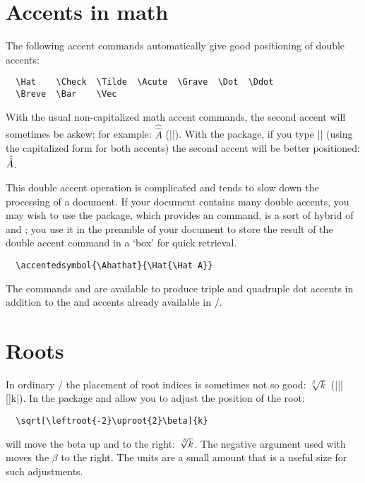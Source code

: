 \documentclass[leqno,titlepage,openany]{amsldoc}
\begin{document}
\section{Accents in math}

The following accent commands automatically give
good positioning of double accents:
\begin{verbatim}
  \Hat    \Check  \Tilde  \Acute  \Grave  \Dot  \Ddot
  \Breve  \Bar    \Vec
\end{verbatim}
With the usual non-capitalized math accent commands,
the second accent will sometimes be askew; for example:
$\hat{\hat{A}}$ (|{}|). With the  package, if
you type |{}| (using the capitalized form for both
accents) the second accent will be better positioned: $\Hat{\Hat{A}}$.

This double accent operation is complicated and tends to slow down the
processing of a document. If your document contains many double
accents, you may wish to use the  package, which provides
an  command.  is a sort of
hybrid of  and ; you use it in the preamble
of your document to store the result of the double accent command in a
`box' for quick retrieval.
\begin{verbatim}
  \accentedsymbol{\Ahathat}{\Hat{\Hat A}}
\end{verbatim}

The commands  and  are available to produce triple
and quadruple dot accents in addition to the  and 
accents already available in \latex/.

\section{Roots}

In ordinary \latex/ the placement of root indices is sometimes not so
good: $\sqrt[\beta]{k}$ (|\sqrt||[\beta]{k}|).  In the
 package  and  allow you to adjust
the position of the root:
\begin{verbatim}
  \sqrt[\leftroot{-2}\uproot{2}\beta]{k}
\end{verbatim}
will move the beta up and to the right:
$\sqrt[\leftroot{-2}\uproot{2}\beta]{k}$. The negative argument used
with  moves the $\beta$ to the right. The units are a small
amount that is a useful size for such adjustments.
\end{document}
